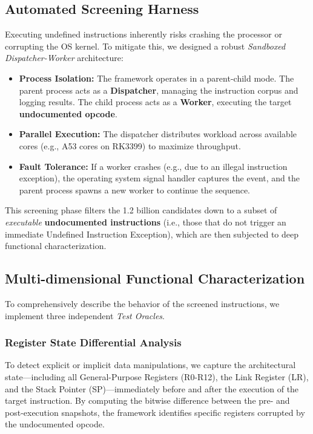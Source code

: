 \documentclass[pdflatex,sn-mathphys]{sn-jnl}%
\theoremstyle{thmstyleone}%
\theoremstyle{thmstyletwo}%
\theoremstyle{thmstylethree}%
\begin{document}
\subsection{Automated Screening Harness}
Executing undefined instructions inherently risks crashing the processor or corrupting the OS kernel. To mitigate this, we designed a robust \textit{Sandboxed Dispatcher-Worker} architecture:
\begin{itemize}
    \item \textbf{Process Isolation:} The framework operates in a parent-child mode. The parent process acts as a \textbf{Dispatcher}, managing the instruction corpus and logging results. The child process acts as a \textbf{Worker}, executing the target \textbf{undocumented opcode}.
    \item \textbf{Parallel Execution:} The dispatcher distributes workload across available cores (e.g., A53 cores on RK3399) to maximize throughput.
    \item \textbf{Fault Tolerance:} If a worker crashes (e.g., due to an illegal instruction exception), the operating system signal handler captures the event, and the parent process spawns a new worker to continue the sequence.
\end{itemize}
This screening phase filters the 1.2 billion candidates down to a subset of \textit{executable} \textbf{undocumented instructions} (i.e., those that do not trigger an immediate Undefined Instruction Exception), which are then subjected to deep functional characterization.

\subsection{Multi-dimensional Functional Characterization}
To comprehensively describe the behavior of the screened instructions, we implement three independent \textit{Test Oracles}.

\subsubsection{Register State Differential Analysis}
To detect explicit or implicit data manipulations, we capture the architectural state—including all General-Purpose Registers (R0-R12), the Link Register (LR), and the Stack Pointer (SP)—immediately before and after the execution of the target instruction. By computing the bitwise difference between the pre- and post-execution snapshots, the framework identifies specific registers corrupted by the undocumented opcode.
\end{document}
